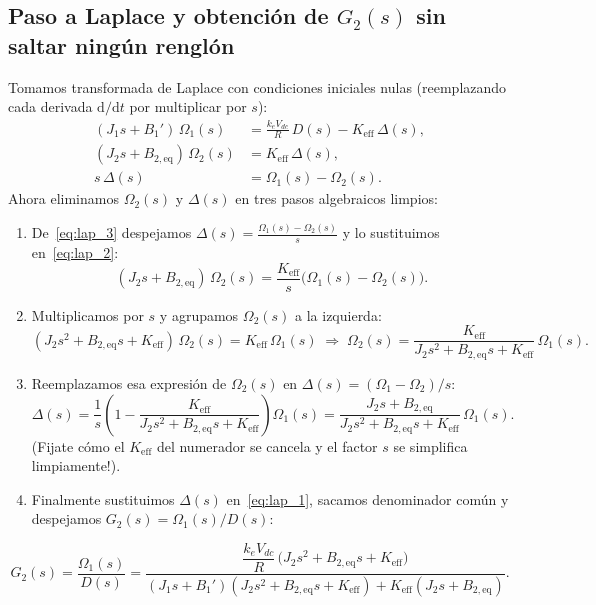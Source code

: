 \documentclass[11pt,a4paper,oneside]{book}
\newcommand{\dd}{\mathrm{d}}
\begin{document}
\subsection{Paso a Laplace y obtención de \texorpdfstring{$G_2(s)$}{G2(s)} sin saltar ningún renglón}
Tomamos transformada de Laplace con condiciones iniciales nulas (reemplazando
cada derivada $\dd/\dd t$ por multiplicar por $s$):
\begin{align}
  (J_1 s + B_1')\,\Omega_1(s) &= \frac{k_e V_{dc}}{R}\,D(s) - K_{\text{eff}}\,\Delta(s), \label{eq:lap_1}\\
  (J_2 s + B_{2,\text{eq}})\,\Omega_2(s) &= K_{\text{eff}}\,\Delta(s), \label{eq:lap_2}\\
  s\,\Delta(s) &= \Omega_1(s) - \Omega_2(s). \label{eq:lap_3}
\end{align}
Ahora eliminamos $\Omega_2(s)$ y $\Delta(s)$ en tres pasos algebraicos limpios:
\begin{enumerate}
  \item De~\eqref{eq:lap_3} despejamos $\Delta(s) = \frac{\Omega_1(s) - \Omega_2(s)}{s}$
        y lo sustituimos en~\eqref{eq:lap_2}:
        \[
          (J_2 s + B_{2,\text{eq}})\,\Omega_2(s) = \frac{K_{\text{eff}}}{s}\big(\Omega_1(s) - \Omega_2(s)\big).
        \]
  \item Multiplicamos por $s$ y agrupamos $\Omega_2(s)$ a la izquierda:
        \[
          (J_2 s^2 + B_{2,\text{eq}} s + K_{\text{eff}})\,\Omega_2(s) = K_{\text{eff}}\,\Omega_1(s)
          \;\Longrightarrow\;
          \Omega_2(s) = \frac{K_{\text{eff}}}{J_2 s^2 + B_{2,\text{eq}} s + K_{\text{eff}}}\,\Omega_1(s).
        \]
  \item Reemplazamos esa expresión de $\Omega_2(s)$ en $\Delta(s) = (\Omega_1 - \Omega_2)/s$:
        \[
          \Delta(s)
          = \frac{1}{s}\left(1 - \frac{K_{\text{eff}}}{J_2 s^2 + B_{2,\text{eq}} s + K_{\text{eff}}}\right)\Omega_1(s)
          = \frac{J_2 s + B_{2,\text{eq}}}{J_2 s^2 + B_{2,\text{eq}} s + K_{\text{eff}}}\,\Omega_1(s).
        \]
        (Fijate cómo el $K_{\text{eff}}$ del numerador se cancela y el factor $s$
        se simplifica limpiamente!).
  \item Finalmente sustituimos $\Delta(s)$ en~\eqref{eq:lap_1}, sacamos
        denominador común y despejamos $G_2(s) = \Omega_1(s)/D(s)$:
\end{enumerate}

\begin{ecuacionclave}
\begin{equation}
  G_2(s) = \frac{\Omega_1(s)}{D(s)}
         = \frac{\dfrac{k_e V_{dc}}{R}\,\big(J_2 s^2 + B_{2,\text{eq}} s + K_{\text{eff}}\big)}
                {(J_1 s + B_1')(J_2 s^2 + B_{2,\text{eq}} s + K_{\text{eff}}) + K_{\text{eff}}(J_2 s + B_{2,\text{eq}})}.
  \label{eq:g2s_cap7}
\end{equation}
\end{ecuacionclave}
\end{document}
